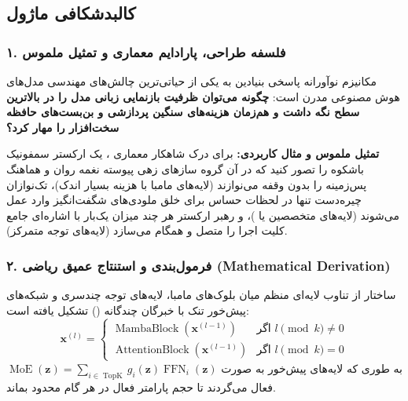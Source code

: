 \subsection{کالبدشکافی ماژول }

\subsubsection*{۱. فلسفه طراحی، پارادایم معماری و تمثیل ملموس}
مکانیزم نوآورانه  پاسخی بنیادین به یکی از حیاتی‌ترین چالش‌های مهندسی مدل‌های هوش مصنوعی مدرن است: \textbf{چگونه می‌توان ظرفیت بازنمایی زبانی مدل را در بالاترین سطح نگه داشت و هم‌زمان هزینه‌های سنگین پردازشی و بن‌بست‌های حافظه سخت‌افزار را مهار کرد؟}

\textbf{تمثیل ملموس و مثال کاربردی:}
برای درک شاهکار معماری ، یک ارکستر سمفونیک باشکوه را تصور کنید که در آن گروه سازهای زهی پیوسته نغمه روان و هماهنگ پس‌زمینه را بدون وقفه می‌نوازند (لایه‌های مامبا با هزینه بسیار اندک)، تک‌نوازان چیره‌دست تنها در لحظات حساس برای خلق ملودی‌های شگفت‌انگیز وارد عمل می‌شوند (لایه‌های متخصصین یا )، و رهبر ارکستر هر چند میزان یک‌بار با اشاره‌ای جامع کلیت اجرا را متصل و همگام می‌سازد (لایه‌های توجه متمرکز).

\subsubsection*{۲. فرمول‌بندی و استنتاج عمیق ریاضی (Mathematical Derivation)}
ساختار  از تناوب لایه‌ای منظم میان بلوک‌های مامبا، لایه‌های توجه چندسری و شبکه‌های پیش‌خور تنک با خبرگان چندگانه () تشکیل یافته است:
\begin{equation}
\mathbf{x}^{(l)} = \begin{cases}
\operatorname{MambaBlock}(\mathbf{x}^{(l-1)}) & \text{اگر } l \pmod k \neq 0 \\
\operatorname{AttentionBlock}(\mathbf{x}^{(l-1)}) & \text{اگر } l \pmod k = 0
\end{cases}
\end{equation}
به طوری که لایه‌های پیش‌خور به صورت $\operatorname{MoE}(\mathbf{z}) = \sum_{i \in \operatorname{TopK}} g_i(\mathbf{z}) \operatorname{FFN}_i(\mathbf{z})$ فعال می‌گردند تا حجم پارامتر فعال در هر گام محدود بماند.

